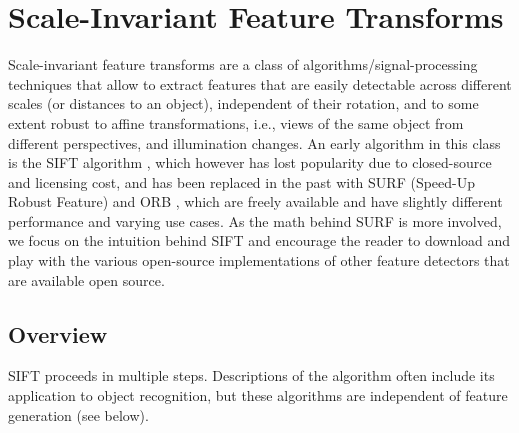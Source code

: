 \section{Scale-Invariant Feature Transforms}
Scale-invariant feature transforms are a class of algorithms/signal-processing techniques that allow to extract features that are easily detectable across different scales (or distances to an object), independent of their rotation, and to some extent robust to affine transformations, i.e., views of the same object from different perspectives, and illumination changes. An early algorithm in this class is the SIFT algorithm \cite{lowe1999object}, which however has lost popularity due to closed-source and licensing cost, and has been replaced in the past with SURF (Speed-Up Robust Feature) \cite{bay2006} and ORB \cite{rublee2011orb},  which are freely available and have slightly different performance and varying use cases. As the math behind SURF is more involved, we focus on the intuition behind SIFT and encourage the reader to download and play with the various open-source implementations of other feature detectors that are available open source.

\subsection{Overview}
SIFT proceeds in multiple steps. Descriptions of the algorithm often include its application to object recognition, but these algorithms are independent of feature generation (see below).

